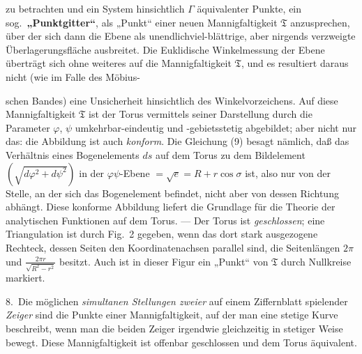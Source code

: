 \documentclass{article}
\begin{document}
zu betrachten und ein System hinsichtlich $\varGamma$ äquivalenter Punkte, ein sog.\ \textbf{„Punktgitter“}, als „Punkt“ einer neuen Mannigfaltigkeit $\mathfrak{T}$ anzusprechen, über der sich dann die Ebene als unendlichviel-blättrige, aber nirgends verzweigte Überlagerungsfläche ausbreitet. Die Euklidische Winkelmessung der Ebene überträgt sich ohne weiteres auf die Mannigfaltigkeit $\mathfrak{T}$, und es resultiert daraus nicht (wie im Falle des Möbius-

schen Bandes) eine Unsicherheit hinsichtlich des Winkelvorzeichens. Auf diese Mannigfaltigkeit $\mathfrak{T}$ ist der Torus vermittels seiner Darstellung durch die Parameter $\varphi$, $\psi$ umkehrbar-eindeutig und -gebietsstetig abgebildet; aber nicht nur das: die Abbildung ist auch \emph{konform}. Die Gleichung (9) besagt nämlich, daß das Verhältnis eines Bogenelements $ds$ auf dem Torus zu dem Bildelement $(\sqrt{d\varphi^2 + d\psi^2})$ in der $\varphi\psi$-Ebene $= \sqrt{e} = R + r \cos \sigma$ ist, also nur von der Stelle, an der sich das Bogenelement befindet, nicht aber von dessen Richtung abhängt. Diese konforme Abbildung liefert die Grundlage für die Theorie der analytischen Funktionen auf dem Torus. --- Der Torus ist \emph{geschlossen}; eine Triangulation ist durch Fig.~2 gegeben, wenn das dort stark ausgezogene Rechteck, dessen Seiten den Koordinatenachsen parallel sind, die Seitenlängen $2\pi$ und $\frac{2\pi r}{\sqrt{R^2 - r^2}}$ besitzt. Auch ist in dieser Figur ein „Punkt“ von $\mathfrak{T}$ durch Nullkreise markiert.

8.\ Die möglichen \emph{simultanen Stellungen zweier} auf einem Ziffernblatt spielender \emph{Zeiger} sind die Punkte einer Mannigfaltigkeit, auf der man eine stetige Kurve beschreibt, wenn man die beiden Zeiger irgendwie gleichzeitig in stetiger Weise bewegt. Diese Mannigfaltigkeit ist offenbar geschlossen und dem Torus äquivalent.
\end{document}
